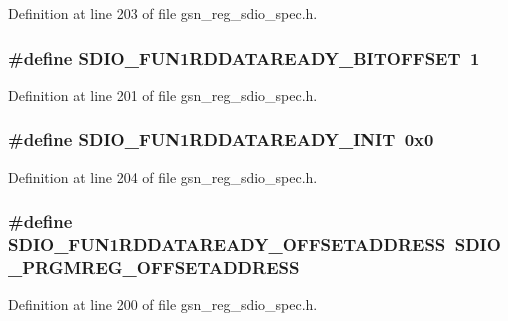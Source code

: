 Definition at line 203 of file gsn\_\-reg\_\-sdio\_\-spec.h.

\hypertarget{a00571_a67a061b260c53d301a61077f0bc4a295}{
\subsubsection[{SDIO\_\-FUN1RDDATAREADY\_\-BITOFFSET}]{\setlength{\rightskip}{0pt plus 5cm}\#define SDIO\_\-FUN1RDDATAREADY\_\-BITOFFSET~1}}
\label{a00571_a67a061b260c53d301a61077f0bc4a295}


Definition at line 201 of file gsn\_\-reg\_\-sdio\_\-spec.h.

\hypertarget{a00571_abab334293304b473679fb071a1dd94be}{
\subsubsection[{SDIO\_\-FUN1RDDATAREADY\_\-INIT}]{\setlength{\rightskip}{0pt plus 5cm}\#define SDIO\_\-FUN1RDDATAREADY\_\-INIT~0x0}}
\label{a00571_abab334293304b473679fb071a1dd94be}


Definition at line 204 of file gsn\_\-reg\_\-sdio\_\-spec.h.

\hypertarget{a00571_a8a8634d3e7ffb6cc76361592e44854a4}{
\subsubsection[{SDIO\_\-FUN1RDDATAREADY\_\-OFFSETADDRESS}]{\setlength{\rightskip}{0pt plus 5cm}\#define SDIO\_\-FUN1RDDATAREADY\_\-OFFSETADDRESS~SDIO\_\-PRGMREG\_\-OFFSETADDRESS}}
\label{a00571_a8a8634d3e7ffb6cc76361592e44854a4}


Definition at line 200 of file gsn\_\-reg\_\-sdio\_\-spec.h.

